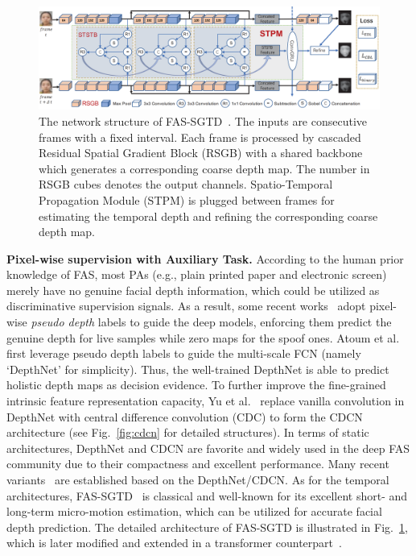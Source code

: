 \documentclass[10pt,journal,compsoc]{IEEEtran}
\begin{document}
\begin{figure}
\centering
\includegraphics[scale=0.5]{Figures/SGTD.png}
  \caption{ 
   The network structure of FAS-SGTD~\cite{wang2020deep}. The inputs are consecutive frames with a fixed interval. Each frame is processed by cascaded Residual Spatial Gradient Block (RSGB) with a shared backbone which generates a corresponding coarse depth map. The number in RSGB cubes denotes the output channels. Spatio-Temporal Propagation Module (STPM) is plugged between frames for estimating the temporal depth and refining the corresponding coarse depth map.}
\label{fig:SGTD}
\end{figure}


\vspace{0.4em}
\noindent\textbf{Pixel-wise supervision with Auxiliary Task.}\quad
According to the human prior knowledge of FAS, most PAs (e.g., plain printed paper and electronic screen) merely have no genuine facial depth information, which could be utilized as discriminative supervision signals. As a result, some recent works~\cite{Atoum2018Face,peng2020ts,yu2020searching,wang2020deep} adopt pixel-wise \textit{pseudo depth} labels to guide the deep models, enforcing them predict the genuine depth for live samples while zero maps for the spoof ones. Atoum et al.~\cite{Atoum2018Face} first leverage pseudo depth labels to guide the multi-scale FCN (namely `DepthNet' for simplicity). Thus, the well-trained DepthNet is able to predict holistic depth maps as decision evidence. To further improve the fine-grained intrinsic feature representation capacity, Yu et al.~\cite{yu2020searching} replace vanilla convolution in DepthNet with central difference convolution (CDC) to form the CDCN architecture (see Fig.~\ref{fig:cdcn} for detailed structures). In terms of static architectures, DepthNet and CDCN are favorite and widely used in the deep FAS community due to their compactness and excellent performance. Many recent variants~\cite{yu2020fas2,yu2021dual,wu2021dual} are established based on the DepthNet/CDCN. As for the temporal architectures, FAS-SGTD~\cite{wang2020deep} is classical and well-known for its excellent short- and long-term micro-motion estimation, which can be utilized for accurate facial depth prediction. The detailed architecture of FAS-SGTD is illustrated in Fig.~\ref{fig:SGTD}, which is later modified and extended in a transformer counterpart~\cite{wang2022learning}. 
\end{document}
